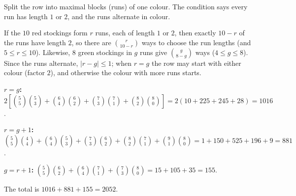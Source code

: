Split the row into maximal blocks (runs) of one colour. The condition says every run has length $1$ or $2$, and the runs alternate in colour.

If the $10$ red stockings form $r$ runs, each of length $1$ or $2$, then exactly $10-r$ of the runs have length $2$, so there are $\binom{r}{10-r}$ ways to choose the run lengths (and $5\le r\le10$). Likewise, $8$ green stockings in $g$ runs give $\binom{g}{8-g}$ ways ($4\le g\le8$). Since the runs alternate, $|r-g|\le1$; when $r=g$ the row may start with either colour (factor $2$), and otherwise the colour with more runs starts.

\textbf{$r=g$:} $2\left[\binom55\binom53+\binom64\binom62+\binom73\binom71+\binom82\binom80\right]=2(10+225+245+28)=1016$.

\textbf{$r=g+1$:} $\binom55\binom44+\binom64\binom53+\binom73\binom62+\binom82\binom71+\binom91\binom80=1+150+525+196+9=881$.

\textbf{$g=r+1$:} $\binom55\binom62+\binom64\binom71+\binom73\binom80=15+105+35=155$.

The total is $1016+881+155=\boxed{2052}$.
